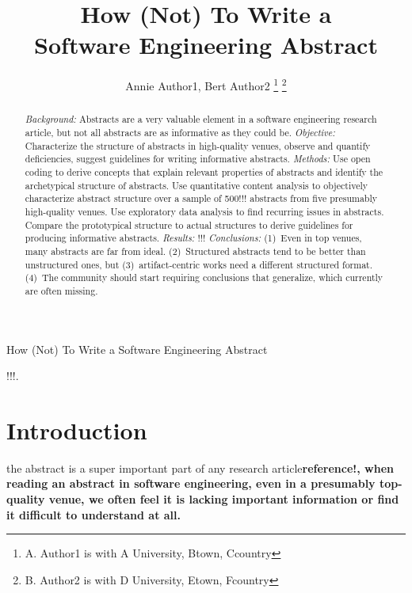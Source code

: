\documentclass[10pt,journal,compsoc]{IEEEtran}
\newcommand{\Todo}[1]{\bgroup\bfseries\Large #1\egroup}
\begin{document}
	
\title{How (Not) To Write a\\Software Engineering Abstract}

\author{Annie Author1, Bert Author2
\thanks{A. Author1 is with A University, Btown, Ccountry}
\thanks{B. Author2 is with D University, Etown, Fcountry}}

%
{How (Not) To Write a Software Engineering Abstract}

\maketitle

\begin{abstract}  %
\emph{Background:}
Abstracts are a very valuable element in a software engineering research article,
but not all abstracts are as informative as they could be.
\emph{Objective:} 
Characterize the structure of abstracts in high-quality venues, 
observe and quantify deficiencies, 
suggest guidelines for writing informative abstracts.
\emph{Methods:}
Use open coding to derive concepts that explain relevant properties of abstracts
and identify the archetypical structure of abstracts.
Use quantitative content analysis to objectively characterize abstract structure
over a sample of 500!!! abstracts from five presumably high-quality venues.
Use exploratory data analysis to find recurring issues in abstracts.
Compare the prototypical structure to actual structures to derive
guidelines for producing informative abstracts.
\emph{Results:}
!!!
\emph{Conclusions:}
(1)~Even in top venues, many abstracts are far from ideal.
(2)~Structured abstracts tend to be better than unstructured ones, 
but (3)~artifact-centric works need a different structured format.
(4)~The community should start requiring conclusions that generalize, 
which currently are often missing.
\end{abstract}

\begin{IEEEkeywords}
!!!.
\end{IEEEkeywords}


\section{Introduction}
 the abstract is a super important part of any research article\Todo{reference!},
when reading an abstract in software engineering, even in a presumably top-quality venue,
we often feel it is lacking important information or find it difficult to understand at all.
\end{document}
